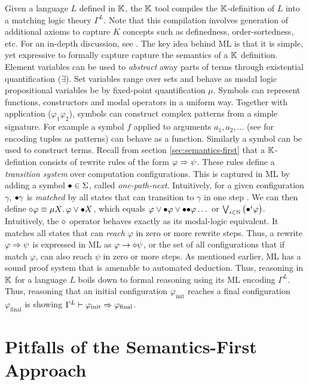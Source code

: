 Given a language $L$ defined in $\mathbb{K}$, the $\mathbb{K}$ tool compiles
the $\mathbb{K}$-definition of $L$ into a matching logic theory $\Gamma^L$.
Note that this compilation involves generation of additional axioms
to capture $K$ concepts such as definedness, order-sortedness, etc.
For an in-depth discussion, see \cite{ChenTR19}.
The key idea behind ML is that it is simple, yet expressive to
formally capture capture the semantics of a $\mathbb{K}$ definition.
Element variables can be used to \emph{abstract} away parts of terms through
existential quantification ($\exists$).
Set variables range over sets and behave as modal logic propositional variables be
by fixed-point quantification $\mu$. Symbols can represent functions,
constructors and modal operators in a uniform way. Together with
application ($\varphi_1 \varphi_2$), symbols can construct complex patterns
from a simple signature. For example a symbol $f$ applied to
arguments $a_1,a_2,\dots$ (see \cite{ChenLICS19} for encoding tuples as
patterns) can behave as a function. Similarly a symbol 
can be used to construct  terms.
Recall from section \ref{sec:semantics-first} that a $\mathbb{K}$-defintion
consists of rewrite rules of the form $\varphi \Rightarrow \psi$. These rules
 define a \emph{transition system} over computation configurations.
This is captured in ML by adding a symbol ${\bullet} \in \Sigma$, called
\emph{one-path-next}. Intuitively, for a given configuration $\gamma$, ${\bullet}\gamma$
is \emph{matched} by all states that can transition to $\gamma$ in one step \cite{ChenTR20}.
We can then define $\diamond \varphi \equiv \mu X \mathord{.\,} \varphi \lor {\bullet} X$,
  which equals $\varphi \vee {\bullet}\varphi \vee {\bullet}{\bullet}\varphi \dots$ or $\bigvee_{i \in
  \mathbb{N}}\left({\bullet}^{i}\varphi\right)$.
Intuitively, the $\diamond$ operator behaves exactly
as its modal-logic equivalent. It matches all states that can \emph{reach} $\varphi$ in zero or more rewrite steps.
Thus, a rewrite $\varphi \Rightarrow \psi$ is expressed in ML as $\varphi \to \diamond \psi$, or
the set of all configurations that if match $\varphi$, can also reach $\psi$ in zero or more steps.
As mentioned earlier, ML has a sound proof system that is amenable to automated
deduction. Thus, reasoning in $\mathbb{K}$ for a language $L$ boils down to formal
reasoning using its ML encoding $\Gamma^{L}$. Thus, reasoning that
an initial configuration $\varphi_{\text{init}}$ reaches a final configuration
$\varphi_{\text{final}}$ is showing $\Gamma^{L} \vdash \varphi_{\text{init}} \Rightarrow
\varphi_{\text{final}}$.

\section{Pitfalls of the Semantics-First Approach}\label{sec:semantics-first-pitfalls}

